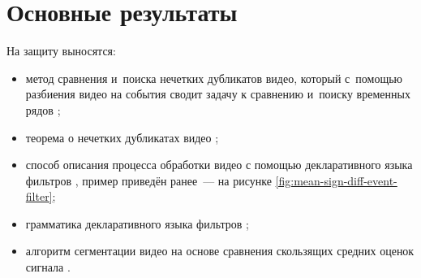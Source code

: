 \documentclass{.local/lib/classes/ndvr-super-article-standalone}
\begin{document}
    \section{Основные результаты}

    На защиту выносятся:
    \begin{itemize}
        \item 
            метод сравнения и~поиска нечетких дубликатов видео, 
            который с~помощью разбиения видео на события 
            сводит задачу к сравнению и~поиску временных рядов \cite{
                Nikitin:CMASS:2013,
                Nikitin:CMASS:2015,
                Nikitin:HSE:2013,
                Nikitin:MGPPU:2013,
                Nikitin:NC:2015,
                Nikitin:NGU:2013,
                Nikitin:RSDN:2014,
                Nikitin:SYTT:2013
            }; 
        \item
            теорема о нечетких дубликатах видео \cite{Lukin:ALG:2017};
        \item
            способ описания процесса обработки видео
            с помощью декларативного языка фильтров \cite{Lukin:ALG:2017}, 
            пример приведён ранее~— на рисунке \ref{fig:mean-sign-diff-event-filter};
        \item 
            грамматика декларативного языка фильтров \cite{Lukin:ALG:2017};
        \item
            алгоритм сегментации видео
            на основе сравнения скользящих 
            средних оценок сигнала \cite{Lukin:ALG:2017}.
    \end{itemize}

\end{document}
